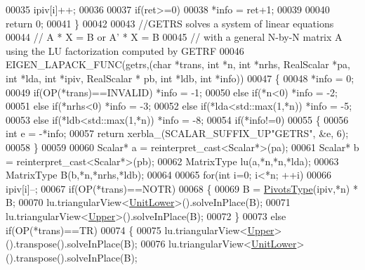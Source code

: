 \begin{DoxyCode}
00035     ipiv[i]++;
00036 
00037   \textcolor{keywordflow}{if}(ret>=0)
00038     *info = ret+1;
00039 
00040   \textcolor{keywordflow}{return} 0;
00041 \}
00042 
00043 \textcolor{comment}{//GETRS solves a system of linear equations}
00044 \textcolor{comment}{//    A * X = B  or  A' * X = B}
00045 \textcolor{comment}{//  with a general N-by-N matrix A using the LU factorization computed  by GETRF}
00046 EIGEN\_LAPACK\_FUNC(getrs,(\textcolor{keywordtype}{char} *trans, \textcolor{keywordtype}{int} *n, \textcolor{keywordtype}{int} *nrhs, RealScalar *pa, \textcolor{keywordtype}{int} *lda, \textcolor{keywordtype}{int} *ipiv, RealScalar *
      pb, \textcolor{keywordtype}{int} *ldb, \textcolor{keywordtype}{int} *info))
00047 \{
00048   *info = 0;
00049         \textcolor{keywordflow}{if}(OP(*trans)==INVALID)  *info = -1;
00050   \textcolor{keywordflow}{else}  \textcolor{keywordflow}{if}(*n<0)                 *info = -2;
00051   \textcolor{keywordflow}{else}  \textcolor{keywordflow}{if}(*nrhs<0)              *info = -3;
00052   \textcolor{keywordflow}{else}  \textcolor{keywordflow}{if}(*lda<std::max(1,*n))  *info = -5;
00053   \textcolor{keywordflow}{else}  \textcolor{keywordflow}{if}(*ldb<std::max(1,*n))  *info = -8;
00054   \textcolor{keywordflow}{if}(*info!=0)
00055   \{
00056     \textcolor{keywordtype}{int} e = -*info;
00057     \textcolor{keywordflow}{return} xerbla\_(SCALAR\_SUFFIX\_UP\textcolor{stringliteral}{"GETRS"}, &e, 6);
00058   \}
00059 
00060   Scalar* a = \textcolor{keyword}{reinterpret\_cast<}Scalar*\textcolor{keyword}{>}(pa);
00061   Scalar* b = \textcolor{keyword}{reinterpret\_cast<}Scalar*\textcolor{keyword}{>}(pb);
00062   MatrixType lu(a,*n,*n,*lda);
00063   MatrixType B(b,*n,*nrhs,*ldb);
00064 
00065   \textcolor{keywordflow}{for}(\textcolor{keywordtype}{int} i=0; i<*n; ++i)
00066     ipiv[i]--;
00067   \textcolor{keywordflow}{if}(OP(*trans)==NOTR)
00068   \{
00069     B = \hyperlink{group___core___module_class_eigen_1_1_map}{PivotsType}(ipiv,*n) * B;
00070     lu.triangularView<\hyperlink{group__enums_gga39e3366ff5554d731e7dc8bb642f83cda8155cfdfde9e75e7144dff0393d17181}{UnitLower}>().solveInPlace(B);
00071     lu.triangularView<\hyperlink{group__enums_gga39e3366ff5554d731e7dc8bb642f83cda6bcb58be3b8b8ec84859ce0c5ac0aaec}{Upper}>().solveInPlace(B);
00072   \}
00073   \textcolor{keywordflow}{else} \textcolor{keywordflow}{if}(OP(*trans)==TR)
00074   \{
00075     lu.triangularView<\hyperlink{group__enums_gga39e3366ff5554d731e7dc8bb642f83cda6bcb58be3b8b8ec84859ce0c5ac0aaec}{Upper}>().transpose().solveInPlace(B);
00076     lu.triangularView<\hyperlink{group__enums_gga39e3366ff5554d731e7dc8bb642f83cda8155cfdfde9e75e7144dff0393d17181}{UnitLower}>().transpose().solveInPlace(B);

\end{DoxyCode}

